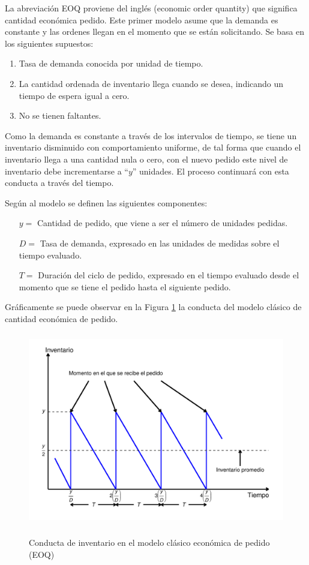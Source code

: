 \label{Modelo_clas_EOQ}
La abreviación EOQ proviene del inglés (economic order quantity) que significa cantidad económica pedido. Este primer modelo asume que la demanda es constante y las ordenes llegan en el momento que se están solicitando. Se basa en los siguientes supuestos:
\begin{enumerate}
	\item Tasa de demanda conocida por unidad de tiempo.
	\item La cantidad ordenada de inventario llega cuando se desea, indicando un tiempo de espera igual a cero.
	\item No se tienen faltantes.
\end{enumerate}
\clearpage
Como la demanda es constante a través de los intervalos de tiempo, se tiene un inventario disminuido con comportamiento uniforme, de tal forma que cuando el inventario llega a una cantidad nula o cero, con el nuevo pedido este nivel de inventario debe incrementarse a ``$y$'' unidades. El proceso continuará con esta conducta a través del tiempo.

Según al modelo se definen las siguientes componentes:

\begin{itemize}
	\item[$y=$] Cantidad de pedido, que viene a ser el número de unidades pedidas.
	\item[$D=$] Tasa de demanda, expresado en las unidades de medidas sobre el tiempo evaluado.
	\item[$T=$] Duración del ciclo de pedido, expresado en el tiempo evaluado desde el momento que se tiene el pedido hasta el siguiente pedido.
\end{itemize}

Gráficamente se puede observar en la Figura \ref{fig:img1} la conducta del modelo clásico de cantidad económica de pedido.

\begin{figure}[H] %
  \caption{Conducta de inventario en el modelo clásico económica de pedido (EOQ)}
  {\includegraphics[width=15cm, height=8.5cm]{images/img1.pdf}}
  \label{fig:img1}
\end{figure}

